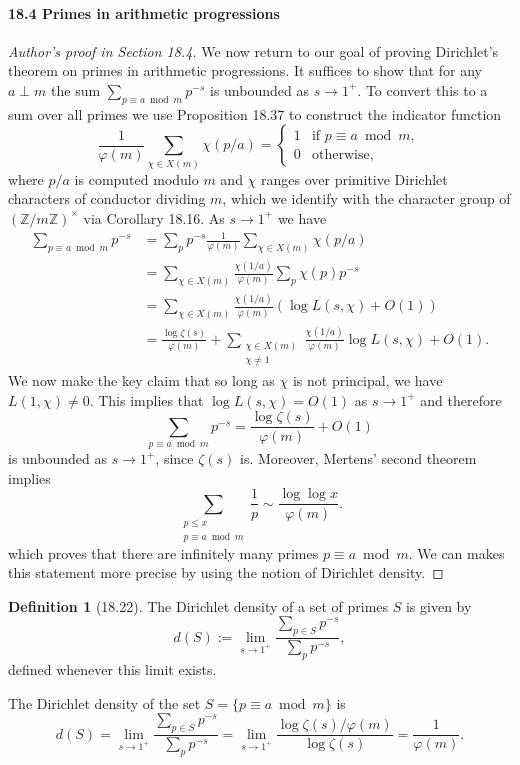\documentclass[UTF8,11pt]{ctexart}
\theoremstyle{definition}
\newtheorem*{definition}{Definition}
\newcommand{\Z}{\mathbb Z}
\begin{document}
\paragraph{18.4 Primes in arithmetic progressions}
\begin{proof}[Author's proof in Section 18.4]
We now return to our goal of proving Dirichlet's theorem on primes in arithmetic progressions. It suffices to show that for any $a\perp m$ the sum $\sum_{p\equiv a\bmod m}p^{-s}$ is unbounded as $s\to1^+$. To convert this to a sum over all primes we use Proposition 18.37 to construct the indicator function
\[
\frac1{\varphi(m)}\sum_{\chi\in X(m)}\chi(p/a)=
\begin{cases}1&\text{if }p\equiv a\bmod m,\\0&\text{otherwise},\end{cases}
\]
where $p/a$ is computed modulo $m$ and $\chi$ ranges over primitive Dirichlet characters of conductor dividing $m$, which we identify with the character group of $(\Z/m\Z)^\times$ via Corollary 18.16. As $s\to1^+$ we have
\begin{align*}
\sum_{p\equiv a\bmod m}p^{-s}
&=\sum_p p^{-s}\frac1{\varphi(m)}\sum_{\chi\in X(m)}\chi(p/a)\\
&=\sum_{\chi\in X(m)}\frac{\chi(1/a)}{\varphi(m)}\sum_p\chi(p)p^{-s}\\
&=\sum_{\chi\in X(m)}\frac{\chi(1/a)}{\varphi(m)}(\log L(s,\chi)+O(1))\\
&=\frac{\log\zeta(s)}{\varphi(m)}+\sum_{\substack{\chi\in X(m)\\\chi\ne1}}\frac{\chi(1/a)}{\varphi(m)}\log L(s,\chi)+O(1).
\end{align*}
We now make the key claim that so long as $\chi$ is not principal, we have $L(1,\chi)\ne0$. This implies that $\log L(s,\chi)=O(1)$ as $s\to1^+$ and therefore
\[
\sum_{p\equiv a\bmod m}p^{-s}=\frac{\log\zeta(s)}{\varphi(m)}+O(1)
\]
is unbounded as $s\to1^+$, since $\zeta(s)$ is. Moreover, Mertens' second theorem implies
\[
\sum_{\substack{p\leq x\\p\equiv a\bmod m}}\frac1p\sim\frac{\log\log x}{\varphi(m)}.
\]
which proves that there are infinitely many primes $p\equiv a\bmod m$. We can makes this statement more precise by using the notion of Dirichlet density.
\end{proof}
\begin{definition}[18.22]
The Dirichlet density of a set of primes $S$ is given by
\[
d(S):=\lim_{s\to1^+}\frac{\sum_{p\in S}p^{-s}}{\sum_pp^{-s}},
\]
defined whenever this limit exists.
\end{definition}
The Dirichlet density of the set $S=\{p\equiv a\bmod m\}$ is
\[
d(S)=\lim_{s\to1^+}\frac{\sum_{p\in S}p^{-s}}{\sum_pp^{-s}}
=\lim_{s\to1^+}\frac{\log\zeta(s)/\varphi(m)}{\log\zeta(s)}=\frac1{\varphi(m)}.
\]
\end{document}
